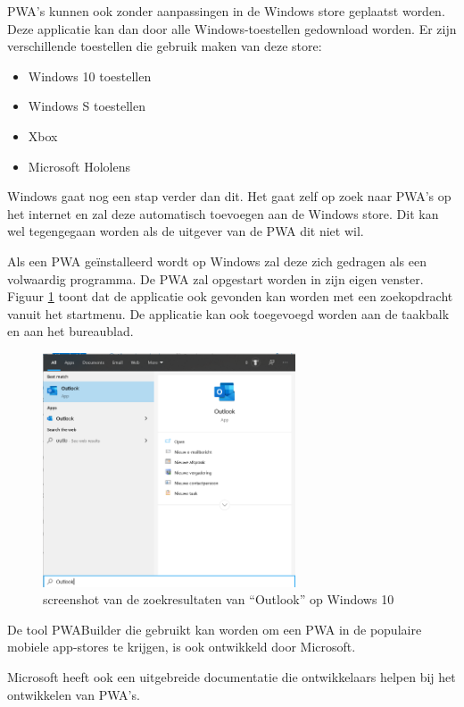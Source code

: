 		PWA's kunnen ook zonder aanpassingen in de Windows store geplaatst worden. Deze applicatie kan dan door alle Windows-toestellen gedownload worden. Er zijn verschillende toestellen die gebruik maken van deze store:
		\begin{itemize}
			\item	Windows 10 toestellen
			\item	Windows S toestellen
			\item	Xbox
			\item	Microsoft Hololens 
		\end{itemize}
		
		Windows gaat nog een stap verder dan dit. Het gaat zelf op zoek naar PWA's op het internet en zal deze automatisch toevoegen aan de Windows store. Dit kan wel tegengegaan worden als de uitgever van de PWA dit niet wil.
		\autocite{Gustafson2017} \autocite{Gustafson2017a}
		
		Als een PWA geïnstalleerd wordt op Windows zal deze zich gedragen als een volwaardig programma. De PWA zal opgestart worden in zijn eigen venster. Figuur \ref{fig:screenSearchWin} toont dat de applicatie ook gevonden kan worden met een zoekopdracht vanuit het startmenu. De applicatie kan ook toegevoegd worden aan de taakbalk en aan het bureaublad.
		
		\newpage
		\begin{figure}[H]
			\centering
			\includegraphics[width=75mm]{./img/Outlook_search_windows.png}
			\caption{screenshot van de zoekresultaten van “Outlook” op Windows 10}
			\label{fig:screenSearchWin}
		\end{figure}
		
		
		De tool PWABuilder die gebruikt kan worden om een PWA in de populaire mobiele app-stores te krijgen, is ook ontwikkeld door Microsoft.
		\autocite{PWAbuilder2020}
		
		Microsoft heeft ook een uitgebreide documentatie die ontwikkelaars helpen bij het ontwikkelen van PWA's.
		\autocite{Microsoft2020b}
		
